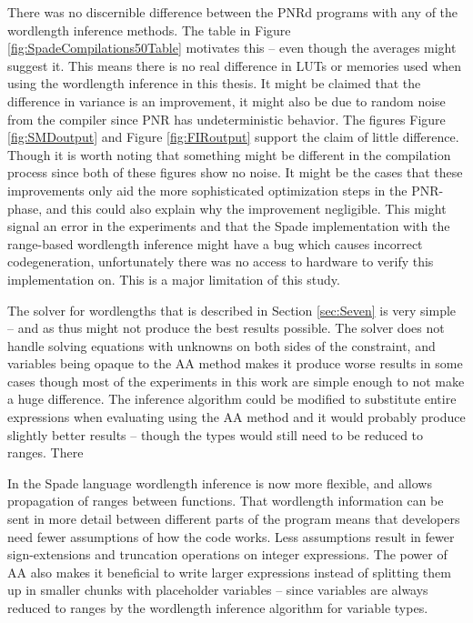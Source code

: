 There was no discernible difference between the PNRd programs with any of the wordlength inference methods. The table in Figure \ref{fig:SpadeCompilations50Table} motivates this -- even though the averages might suggest it. This means there is no real difference in LUTs or memories used when using the wordlength inference in this thesis. It might be claimed that the difference in variance is an improvement, it might also be due to random noise from the compiler since PNR has undeterministic behavior. The figures Figure \ref{fig:SMDoutput} and Figure \ref{fig:FIRoutput} support the claim of little difference. Though it is worth noting that something might be different in the compilation process since both of these figures show no noise. It might be the cases that these improvements only aid the more sophisticated optimization steps in the PNR-phase, and this could also explain why the improvement negligible. This might signal an error in the experiments and that the Spade implementation with the range-based wordlength inference might have a bug which causes incorrect codegeneration, unfortunately there was no access to hardware to verify this implementation on. This is a major limitation of this study.

The solver for wordlengths that is described in Section \ref{sec:Seven} is very simple -- and as thus might not produce the best results possible. The solver does not handle solving equations with unknowns on both sides of the constraint, and variables being opaque to the AA method makes it produce worse results in some cases though most of the experiments in this work are simple enough to not make a huge difference. The inference algorithm could be modified to substitute entire expressions when evaluating using the AA method and it would probably produce slightly better results -- though the types would still need to be reduced to ranges. There

In the Spade language wordlength inference is now more flexible, and allows propagation of ranges between functions. That wordlength information can be sent in more detail between different parts of the program means that developers need fewer assumptions of how the code works. Less assumptions result in fewer sign-extensions and truncation operations on integer expressions. The power of AA also makes it beneficial to write larger expressions instead of splitting them up in smaller chunks with placeholder variables -- since variables are always reduced to ranges by the wordlength inference algorithm for variable types.

